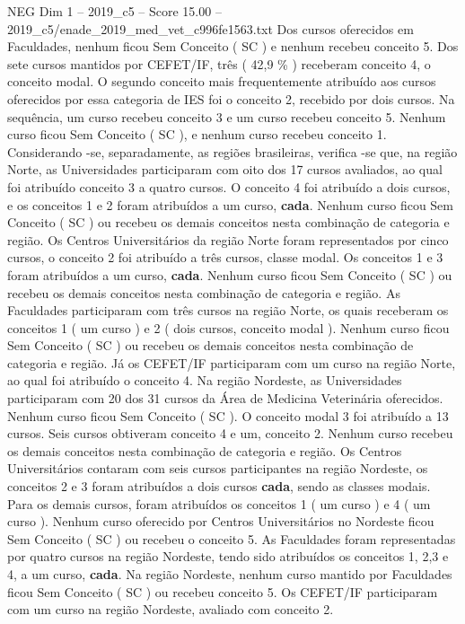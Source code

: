 \begin{textsample}{NEG Dim 1 – 2019\_c5 – Score 15.00 – 2019\_c5/enade\_2019\_med\_vet\_c996fe1563.txt}
Dos cursos oferecidos em Faculdades, nenhum ficou Sem Conceito ( SC ) e nenhum recebeu conceito 5.
Dos sete cursos mantidos por CEFET/IF, três ( 42,9 \% ) receberam conceito 4, o conceito modal.
O segundo conceito mais frequentemente atribuído aos cursos oferecidos por essa categoria de IES foi o conceito 2, recebido por dois cursos.
Na sequência, um curso recebeu conceito 3 e um curso recebeu conceito 5.
Nenhum curso ficou Sem Conceito ( SC ), e nenhum curso recebeu conceito 1.
Considerando -se, separadamente, as regiões brasileiras, verifica -se que, na região Norte, as Universidades participaram com oito dos 17 cursos avaliados, ao qual foi atribuído conceito 3 a quatro cursos.
O conceito 4 foi atribuído a dois cursos, e os conceitos 1 e 2 foram atribuídos a um curso, \textbf{cada}.
Nenhum curso ficou Sem Conceito ( SC ) ou recebeu os demais conceitos nesta combinação de categoria e região.
Os Centros Universitários da região Norte foram representados por cinco cursos, o conceito 2 foi atribuído a três cursos, classe modal.
Os conceitos 1 e 3 foram atribuídos a um curso, \textbf{cada}.
Nenhum curso ficou Sem Conceito ( SC ) ou recebeu os demais conceitos nesta combinação de categoria e região.
As Faculdades participaram com três cursos na região Norte, os quais receberam os conceitos 1 ( um curso ) e 2 ( dois cursos, conceito modal ).
Nenhum curso ficou Sem Conceito ( SC ) ou recebeu os demais conceitos nesta combinação de categoria e região.
Já os CEFET/IF participaram com um curso na região Norte, ao qual foi atribuído o conceito 4.
Na região Nordeste, as Universidades participaram com 20 dos 31 cursos da Área de Medicina Veterinária oferecidos.
Nenhum curso ficou Sem Conceito ( SC ).
O conceito modal 3 foi atribuído a 13 cursos.
Seis cursos obtiveram conceito 4 e um, conceito 2.
Nenhum curso recebeu os demais conceitos nesta combinação de categoria e região.
Os Centros Universitários contaram com seis cursos participantes na região Nordeste, os conceitos 2 e 3 foram atribuídos a dois cursos \textbf{cada}, sendo as classes modais.
Para os demais cursos, foram atribuídos os conceitos 1 ( um curso ) e 4 ( um curso ).
Nenhum curso oferecido por Centros Universitários no Nordeste ficou Sem Conceito ( SC ) ou recebeu o conceito 5.
As Faculdades foram representadas por quatro cursos na região Nordeste, tendo sido atribuídos os conceitos 1, 2,3 e 4, a um curso, \textbf{cada}.
Na região Nordeste, nenhum curso mantido por Faculdades ficou Sem Conceito ( SC ) ou recebeu conceito 5.
Os CEFET/IF participaram com um curso na região Nordeste, avaliado com conceito 2.

\end{textsample}
